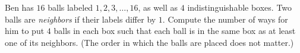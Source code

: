 Ben has $16$ balls labeled $1,2,3, \ldots, 16$, as well as $4$ indistinguishable boxes. Two balls are \emph{neighbors} if their labels differ by $1$. Compute the number of ways for him to put $4$ balls in each box such that each ball is in the same box as at least one of its neighbors. (The order in which the balls are placed does not matter.)
